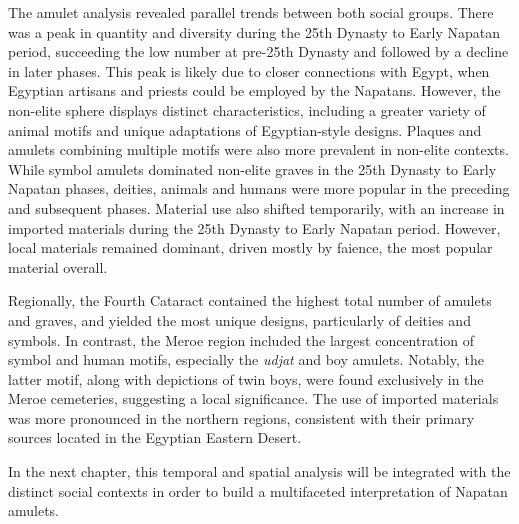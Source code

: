 The amulet analysis revealed parallel trends	between both social groups. There was a peak in quantity and diversity during the 25th Dynasty to Early Napatan period, succeeding the low number at pre-25th Dynasty and followed by a decline in later phases. This peak is likely due to closer connections with Egypt, when Egyptian artisans and priests could be employed by the Napatans. However, the non-elite sphere displays distinct characteristics, including a greater variety of animal motifs and unique adaptations of Egyptian-style designs. Plaques and amulets combining multiple motifs were also more prevalent in non-elite contexts. While symbol amulets dominated non-elite graves in the 25th Dynasty to Early Napatan phases, deities, animals and humans were more popular in the preceding and subsequent phases. Material use also shifted temporarily, with an increase in imported materials during the 25th Dynasty to Early Napatan period. However, local materials remained dominant, driven mostly by faience, the most popular material overall. 


Regionally, the Fourth Cataract contained the highest total number of amulets and graves, and yielded the most unique designs, particularly of deities and symbols. In contrast, the Meroe region included the largest concentration of symbol and human motifs, especially the \textit{udjat} and boy amulets. Notably, the latter motif, along with depictions of twin boys, were found exclusively in the Meroe cemeteries, suggesting a local significance. The use of imported materials was more pronounced in the northern regions, consistent with their primary sources located in the Egyptian Eastern Desert.


In the next chapter, this temporal and spatial analysis will be integrated with the distinct social contexts in order to build a multifaceted interpretation of Napatan amulets.